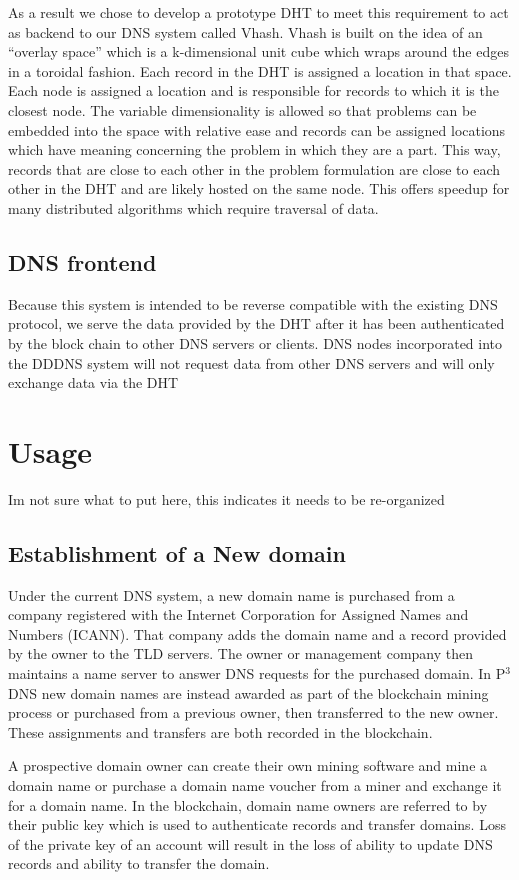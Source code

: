 \documentclass[11pt]{IEEEtran} %
\begin{document}
As a result we chose to develop a prototype DHT to meet this requirement to act as backend to our DNS system called Vhash. Vhash is built on the idea of an “overlay space” which is a k-dimensional unit cube which wraps around the edges in a toroidal fashion. Each record in the DHT is assigned a location in that space. Each node is assigned a location and is responsible for records to which it is the closest node. The variable dimensionality is allowed so that problems can be embedded into the space with relative ease and records can be assigned locations which have meaning concerning the problem in which they are a part. This way, records that are close to each other in the problem formulation are close to each other in the DHT and are likely hosted on the same node. This offers speedup for many distributed algorithms which require traversal of data.



\subsection{DNS frontend}
Because this system is intended to be reverse compatible with the existing DNS protocol, we serve the data provided by the DHT after it has been authenticated by the block chain to other DNS servers or clients. DNS nodes incorporated into the DDDNS system will not request data from other DNS servers and will only exchange data via the DHT 

\section{Usage}
Im not sure what to put here, this indicates it needs to be re-organized
\subsection{Establishment of a New domain}
Under the current DNS system, a new domain name is purchased from a company registered with the Internet Corporation for Assigned Names and Numbers (ICANN). That company adds the domain name and a record provided by the owner to the TLD servers. The owner or management company then maintains a name server to answer DNS requests for the purchased domain. In P$^{3}$DNS new domain names are instead awarded as part of the blockchain mining process or purchased from a previous owner, then transferred to the new owner. These assignments and transfers are both recorded in the blockchain. 

A prospective domain owner can create their own mining software and mine a domain name or purchase a domain name voucher from a miner and exchange it for a domain name. In the blockchain, domain name owners are referred to by their public key which is used to authenticate records and transfer domains. Loss of the private key of an account will result in the loss of ability to update DNS records and ability to transfer the domain. 
\end{document}
